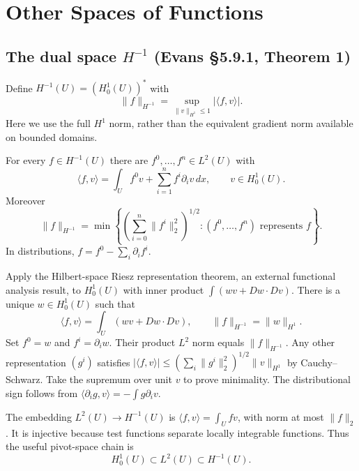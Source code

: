 \section{Other Spaces of Functions}
\label{sec:5-9}

\subsection{The dual space $H^{-1}$ (Evans \S5.9.1, Theorem 1)}
Define $H^{-1}(U)=(H^1_0(U))^*$ with
\[
 \|f\|_{H^{-1}}=\sup_{\|v\|_{H^1}\leq1}|\langle f,v\rangle|.
\]
Here we use the full $H^1$ norm, rather than the equivalent gradient
norm available on bounded domains.
\begin{theorem}
For every $f\in H^{-1}(U)$ there are $f^0,\ldots,f^n\in L^2(U)$ with
\[
 \langle f,v\rangle=\int_U f^0v+\sum_{i=1}^nf^i\partial_i v\,dx,
 \qquad v\in H^1_0(U).
\]
Moreover
\[
 \|f\|_{H^{-1}}
 =\min\left\{\left(\sum_{i=0}^n\|f^i\|_2^2\right)^{1/2}:
                (f^0,\ldots,f^n)\text{ represents }f\right\}.
\]
In distributions, $f=f^0-\sum_i\partial_i f^i$.
\end{theorem}
\Needspace{45mm}
\begin{expandedproof}
Apply the Hilbert-space Riesz representation theorem, an external
functional analysis result, to $H^1_0(U)$ with inner product
$\int(wv+Dw\cdot Dv)$. There is a unique $w\in H^1_0(U)$ such that
\[
 \langle f,v\rangle=\int_U(wv+Dw\cdot Dv),\qquad
 \|f\|_{H^{-1}}=\|w\|_{H^1}.
\]
Set $f^0=w$ and $f^i=\partial_iw$. Their product $L^2$ norm equals
$\|f\|_{H^{-1}}$. Any other representation $(g^i)$ satisfies
$|\langle f,v\rangle|\leq(\sum_i\|g^i\|_2^2)^{1/2}\|v\|_{H^1}$
by Cauchy--Schwarz. Take the supremum over unit $v$ to prove minimality.
The distributional sign follows from
$\langle\partial_i g,v\rangle=-\int g\partial_i v$.
\end{expandedproof}
The embedding $L^2(U)\to H^{-1}(U)$ is
$\langle f,v\rangle=\int_Ufv$, with norm at most $\|f\|_2$.
It is injective because test functions separate locally integrable
functions. Thus the useful pivot-space chain is
\[
 H^1_0(U)\subset L^2(U)\subset H^{-1}(U).
\]
\Needspace{45mm}

